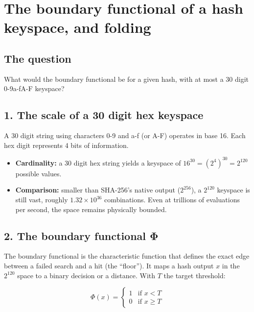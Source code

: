 \chapter{\texorpdfstring{The boundary functional of a hash keyspace, and folding}{The boundary functional of a hash keyspace, and folding}}
\label{chap:hash-boundary-functional-folding}

\section{\texorpdfstring{The question}{The question}}

What would the boundary functional be for a given hash, with at most a 30 digit 0-9a-fA-F keyspace?

\section{\texorpdfstring{1. The scale of a 30 digit hex keyspace}{1. The scale of a 30 digit hex keyspace}}

A 30 digit string using characters 0-9 and a-f (or A-F) operates in base 16. Each hex digit represents 4 bits of information.

\begin{itemize}
\item \textbf{Cardinality:} a 30 digit hex string yields a keyspace of \(16^{30} = (2^4)^{30} = 2^{120}\) possible values.
\item \textbf{Comparison:} smaller than SHA-256's native output (\(2^{256}\)), a \(2^{120}\) keyspace is still vast, roughly \(1.32 \times 10^{36}\) combinations. Even at trillions of evaluations per second, the space remains physically bounded.
\end{itemize}

\section{\texorpdfstring{2. The boundary functional Φ}{2. The boundary functional Φ}}

The boundary functional is the characteristic function that defines the exact edge between a failed search and a hit (the “floor”). It maps a hash output \(x\) in the \(2^{120}\) space to a binary decision or a distance. With \(T\) the target threshold:

\[
\Phi(x) = \begin{cases} 1 & \text{if } x < T \\ 0 & \text{if } x \ge T \end{cases}
\]

